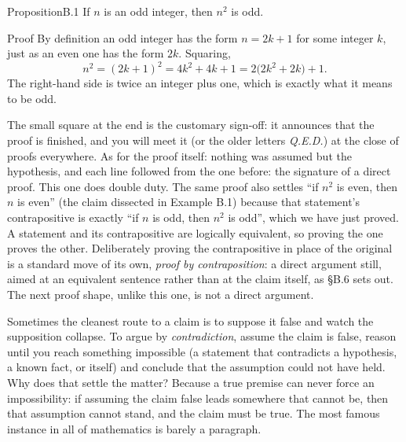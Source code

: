 \documentclass[a4paper,12pt,oneside]{memoir}
\begin{document}
\begin{envproposition}{Proposition}{B.1}{}
If \(n\) is an odd integer, then \(n^{2}\) is odd.
\end{envproposition}
\begin{envproof}{Proof}{}{}
By definition an odd integer has the form \(n = 2k + 1\) for some integer \(k\), just as an even one has the form \(2k\). Squaring, \[ n^{2} = (2k + 1)^{2} = 4k^{2} + 4k + 1 = 2\bigl(2k^{2} + 2k\bigr) + 1. \] The right-hand side is twice an integer plus one, which is exactly what it means to be odd. \qedmark
\end{envproof}
The small square at the end is the customary sign-off: it announces that the proof is finished, and you will meet it (or the older letters \emph{Q.E.D.}) at the close of proofs everywhere. As for the proof itself: nothing was assumed but the hypothesis, and each line followed from the one before: the signature of a direct proof. This one does double duty. The same proof also settles “if \(n^{2}\) is even, then \(n\) is even” (the claim dissected in Example B.1) because that statement’s contrapositive is exactly “if \(n\) is odd, then \(n^{2}\) is odd”, which we have just proved. A statement and its contrapositive are logically equivalent, so proving the one proves the other. Deliberately proving the contrapositive in place of the original is a standard move of its own, \emph{proof by contraposition}: a direct argument still, aimed at an equivalent sentence rather than at the claim itself, as §B.6 sets out. The next proof shape, unlike this one, is not a direct argument.

 Sometimes the cleanest route to a claim is to suppose it false and watch the supposition collapse. To argue by \emph{contradiction}, assume the claim is false, reason until you reach something impossible (a statement that contradicts a hypothesis, a known fact, or itself) and conclude that the assumption could not have held. Why does that settle the matter? Because a true premise can never force an impossibility: if assuming the claim false leads somewhere that cannot be, then that assumption cannot stand, and the claim must be true. The most famous instance in all of mathematics is barely a paragraph.
\end{document}
